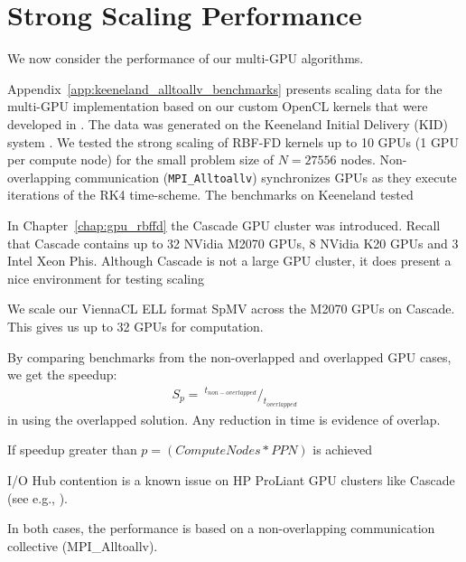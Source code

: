 \section{Strong Scaling Performance}

We now consider the performance of our multi-GPU algorithms. 


Appendix~\ref{app:keeneland_alltoallv_benchmarks} presents scaling data for the multi-GPU implementation based on our custom OpenCL kernels that were developed in \cite{BolligFlyerErlebacher2012}. The data was generated on the Keeneland Initial Delivery (KID) system \cite{Vetter2011}. We tested the strong scaling of RBF-FD kernels up to 10 GPUs (1 GPU per compute node) for the small problem size of $N=27556$ nodes. Non-overlapping communication (\texttt{MPI\_Alltoallv}) synchronizes GPUs as they execute iterations of the RK4 time-scheme. The benchmarks on Keeneland tested


In Chapter~\ref{chap:gpu_rbffd} the Cascade GPU cluster was introduced. Recall that Cascade contains up to 32 NVidia M2070 GPUs, 8 NVidia K20 GPUs and 3 Intel Xeon Phis. Although Cascade is not a large GPU cluster, it does present a nice environment for testing scaling 

We scale our ViennaCL ELL format SpMV across the M2070 GPUs on Cascade. This gives us up to 32 GPUs for computation. 

By comparing benchmarks from the non-overlapped and overlapped GPU cases, we get the speedup: 
\begin{align*} 
S_p = \ ^{t_{non-overlapped}} /_{t_{overlapped}}
\end{align*}
in using the overlapped solution. Any reduction in time is evidence of overlap. 

If speedup greater than $p = (Compute Nodes * PPN)$ is achieved 



I/O Hub contention is a known issue on HP ProLiant GPU clusters like Cascade (see e.g., \cite{Spafford2011}). 



In both cases, the performance is based on a non-overlapping communication collective (MPI\_Alltoallv).


